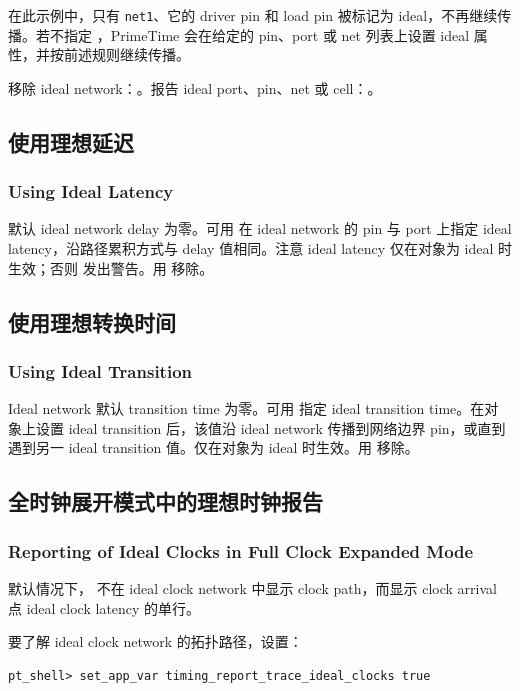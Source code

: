 在此示例中，只有 \texttt{net1}、它的 driver pin 和 load pin 被标记为 ideal，不再继续传播。若不指定 ，PrimeTime 会在给定的 pin、port 或 net 列表上设置 ideal 属性，并按前述规则继续传播。

移除 ideal network：。报告 ideal port、pin、net 或 cell：。

\subsection{使用理想延迟}
\subsubsection*{Using Ideal Latency}

默认 ideal network delay 为零。可用  在 ideal network 的 pin 与 port 上指定 ideal latency，沿路径累积方式与 delay 值相同。注意 ideal latency 仅在对象为 ideal 时生效；否则  发出警告。用  移除。

\subsection{使用理想转换时间}
\subsubsection*{Using Ideal Transition}

Ideal network 默认 transition time 为零。可用  指定 ideal transition time。在对象上设置 ideal transition 后，该值沿 ideal network 传播到网络边界 pin，或直到遇到另一 ideal transition 值。仅在对象为 ideal 时生效。用  移除。

\subsection{全时钟展开模式中的理想时钟报告}
\subsubsection*{Reporting of Ideal Clocks in Full Clock Expanded Mode}

默认情况下， 不在 ideal clock network 中显示 clock path，而显示 clock arrival 点 ideal clock latency 的单行。

要了解 ideal clock network 的拓扑路径，设置：
\begin{lstlisting}
pt_shell> set_app_var timing_report_trace_ideal_clocks true
\end{lstlisting}

